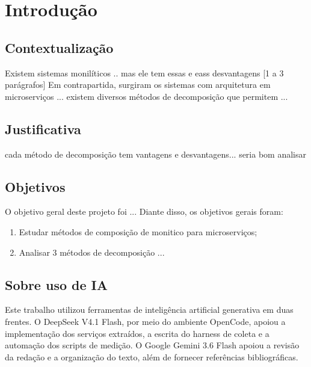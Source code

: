 \chapter[Introdução]{Introdução}


\section{Contextualização}

Existem sistemas monilíticos ..
mas ele tem essas e eass desvantagens [1 a 3 parágrafos]
Em contrapartida, surgiram os sistemas com arquitetura em microserviços ...
existem diversos métodos de decomposição que permitem ...

\section{Justificativa}

cada método de decomposição tem vantagens e desvantagens... seria bom analisar

\section{Objetivos}

O objetivo geral deste projeto foi ... Diante disso, os objetivos gerais foram:
\begin{enumerate}
    \item Estudar métodos de composição de monitico para microserviços;
    \item Analisar 3 métodos de decomposição ...
\end{enumerate}

\section{Sobre uso de IA}

Este trabalho utilizou ferramentas de inteligência artificial generativa em duas frentes. O DeepSeek V4.1 Flash, por meio do ambiente OpenCode, apoiou a implementação dos serviços extraídos, a escrita do harness de coleta e a automação dos scripts de medição. O Google Gemini 3.6 Flash apoiou a revisão da redação e a organização do texto, além de fornecer referências bibliográficas.

